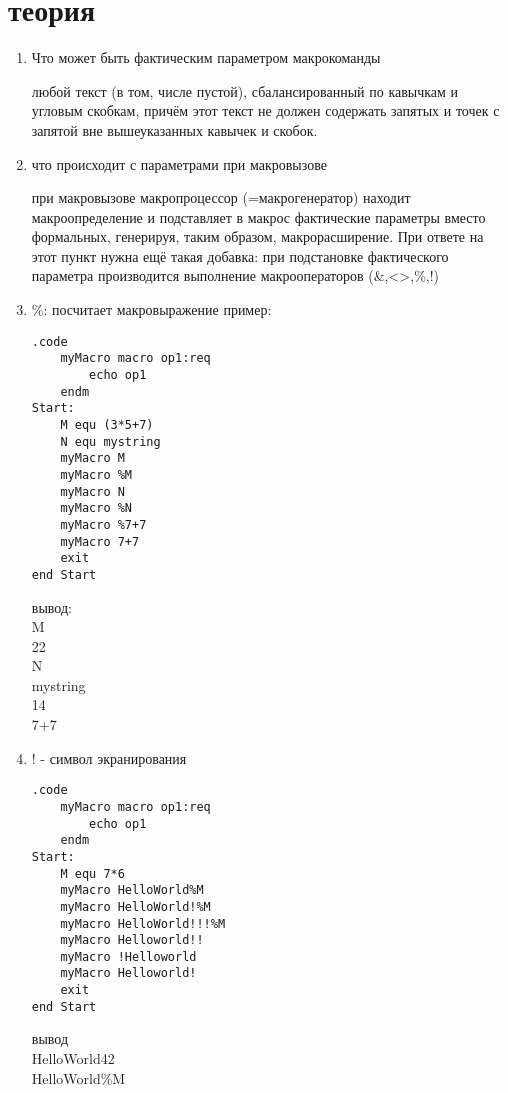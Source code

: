 \documentclass[a4paper,10pt]{article}
\begin{document}
\section*{теория}
\begin{enumerate}
    \item Что может быть фактическим параметром макрокоманды \par
    любой текст (в том, числе пустой), сбалансированный по кавычкам и угловым скобкам, причём
    этот текст не должен содержать запятых и точек с запятой вне вышеуказанных кавычек и скобок.
    \item что происходит с параметрами при макровызове \par
    при макровызове макропроцессор (=макрогенератор) находит макроопределение и подставляет в
    макрос фактические параметры вместо формальных, генерируя, таким образом, макрорасширение.
    При ответе на этот пункт нужна ещё такая добавка: при подстановке фактического параметра
    производится выполнение макрооператоров (\&,<>,\%,!)
    \item \%: посчитает макровыражение пример:
\begin{multicols}{2}
    \begin{verbatim}
.code
    myMacro macro op1:req
        echo op1
    endm
Start:
    M equ (3*5+7)
    N equ mystring
    myMacro M
    myMacro %M
    myMacro N
    myMacro %N
    myMacro %7+7
    myMacro 7+7
    exit
end Start
    \end{verbatim}
    \columnbreak
вывод: \\
M \\
22 \\
N \\
mystring \\
14 \\
7+7 \\
\end{multicols}
\item ! - символ экранирования
\begin{multicols}{2}
\begin{verbatim}
.code
    myMacro macro op1:req
        echo op1
    endm
Start:
    M equ 7*6
    myMacro HelloWorld%M
    myMacro HelloWorld!%M
    myMacro HelloWorld!!!%M
    myMacro Helloworld!!
    myMacro !Helloworld
    myMacro Helloworld!
    exit
end Start
\end{verbatim}
    \columnbreak
вывод \\
HelloWorld42 \\
HelloWorld\%M \\

\end{multicols}
\end{enumerate}
\end{document}
